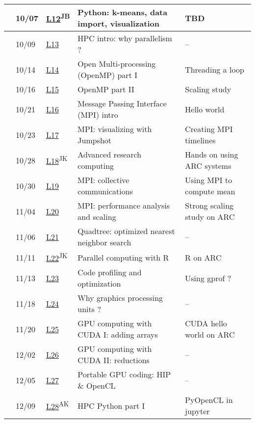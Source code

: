\begin{table}[htbp!]
\begin{tabular}{l|l|l||l|l}
  & 10/07 & \hyperref[PythonViz.chap]{L12}\textsuperscript{JB} & Python: k-means, data import, visualization & TBD  \\ \hline \hline
  & 10/09 & \hyperref[HPCIntro.chap]{L13} & HPC intro: why parallelism ? & -- \\
  & 10/14 & \hyperref[OpenMPIntro.chap]{L14} &  Open Multi-processing (OpenMP) part I & Threading a loop \\ 
  & 10/16 & \hyperref[OpenMPadvanced.chap]{L15} & OpenMP part II  & Scaling study \\
  & 10/21 & \hyperref[MPIIntro.chap]{L16} & Message Passing Interface (MPI) intro & Hello world \\ 
  & 10/23 & \hyperref[MPIViz.chap]{L17} & MPI: visualizing with Jumpshot & Creating MPI timelines \\
  & 10/28 & \hyperref[ARC.chap]{L18}\textsuperscript{JK} & Advanced research computing & Hands on using ARC systems \\
  & 10/30 & \hyperref[MPICollectives.chap]{L19} & MPI: collective communications & Using MPI to compute mean \\
  \parbox[t]{2mm}{}& 11/04 & \hyperref[MPIPerformance.chap]{L20} & MPI: performance analysis and scaling  & Strong scaling study on ARC \\ \hline \hline
  & 11/06 & \hyperref[quadtree.chap]{L21} & Quadtree: optimized nearest neighbor search & -- \\
    & 11/11 & \hyperref[ParallelR.chap]{L22}\textsuperscript{JK} & Parallel computing with R & R on ARC \\
  & 11/13 & \hyperref[performance.chap]{L23} & Code profiling and optimization & Using gprof ? \\
  & 11/18 & \hyperref[whyGPUs.chap]{L24} & Why graphics processing units ? & -- \\
  & 11/20 & \hyperref[CUDAhelloWorld.chap]{L25} & GPU computing with CUDA I: adding arrays & CUDA hello world on ARC\\
  & 12/02 & \hyperref[CUDAreductions.chap]{L26} & GPU computing with CUDA II: reductions & -- \\ 
   & 12/05 & \hyperref[advancedGPU.chap]{L27} & Portable GPU coding: HIP \& OpenCL & -- \\ 
  & 12/09 & \hyperref[pythonGPU.chap]{L28}\textsuperscript{AK} & HPC Python part I & PyOpenCL in jupyter \\

\end{tabular}
\end{table}
